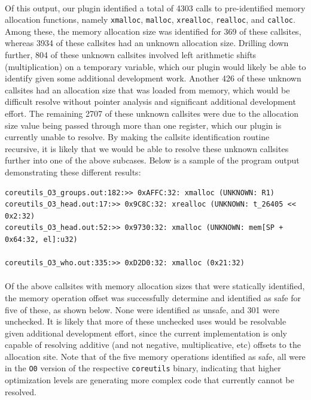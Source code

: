 \documentclass[letterpaper,11pt]{article}
\begin{document}
\paragraph{}
Of this output, our plugin identified a total of 4303 calls to pre-identified
memory allocation functions, namely \texttt{xmalloc}, \texttt{malloc}, \texttt{xrealloc},
\texttt{realloc}, and \texttt{calloc}. Among these, the memory allocation size was
identified for 369 of these callsites, whereas 3934 of these callsites had an
unknown allocation size. Drilling down further, 804 of these unknown callsites
involved left arithmetic shifts (multiplication) on a temporary variable, which
our plugin would likely be able to identify given some additional development
work.  Another 426 of these unknown callsites had an allocation size that was
loaded from memory, which would be difficult resolve without pointer analysis
and significant additional development effort. The remaining 2707 of these
unknown callsites were due to the allocation size value being passed through
more than one register, which our plugin is currently unable to resolve. By
making the callsite identification routine recursive, it is likely that we
would be able to resolve these unknown callsites further into one of the above
subcases.  Below is a sample of the program output demonstrating these
different results:


\tiny
\begin{verbatim}
coreutils_O3_groups.out:182:>> 0xAFFC:32: xmalloc (UNKNOWN: R1)
coreutils_O3_head.out:17:>> 0x9C8C:32: xrealloc (UNKNOWN: t_26405 << 0x2:32)
coreutils_O3_head.out:52:>> 0x9730:32: xmalloc (UNKNOWN: mem[SP + 0x64:32, el]:u32)

coreutils_O3_who.out:335:>> 0xD2D0:32: xmalloc (0x21:32)
\end{verbatim}
\normalsize

\paragraph{}
Of the above callsites with memory allocation sizes that were statically
identified, the memory operation offset was successfully determine and
identified as safe for five of these, as shown below. None were identified as
unsafe, and 301 were unchecked. It is likely that more of these unchecked uses
would be resolvable given additional development effort, since the current
implementation is only capable of resolving additive (and not negative,
multiplicative, etc) offsets to the allocation site. Note that of the five
memory operations identified as safe, all were in the \texttt{O0} version of the
respective \texttt{coreutils} binary, indicating that higher optimization levels are
generating more complex code that currently cannot be resolved.
\end{document}
